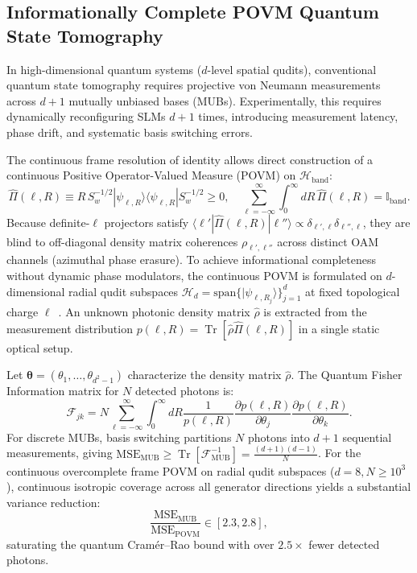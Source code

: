 \documentclass{optica-article}
\begin{document}
\subsection{Informationally Complete POVM Quantum State Tomography}

In high-dimensional quantum systems ($d$-level spatial qudits), conventional quantum state tomography requires projective von Neumann measurements across $d+1$ mutually unbiased bases (MUBs). Experimentally, this requires dynamically reconfiguring SLMs $d+1$ times, introducing measurement latency, phase drift, and systematic basis switching errors.

The continuous frame resolution of identity allows direct construction of a continuous Positive Operator-Valued Measure (POVM) on $\mathcal{H}_{\text{band}}$:
\begin{equation}
\boxed{\hat{\Pi}(\ell, R) \equiv R \, S_w^{-1/2} |\psi_{\ell, R}\rangle \langle \psi_{\ell, R}| S_w^{-1/2} \ge 0, \quad \sum_{\ell=-\infty}^\infty \int_0^\infty dR \, \hat{\Pi}(\ell, R) = \mathbb{I}_{\text{band}}.}
\label{eq:povm_def}
\end{equation}
Because definite-$\ell$ projectors satisfy $\langle \ell' | \hat{\Pi}(\ell, R) | \ell'' \rangle \propto \delta_{\ell', \ell} \delta_{\ell'', \ell}$, they are blind to off-diagonal density matrix coherences $\rho_{\ell', \ell''}$ across distinct OAM channels (azimuthal phase erasure). To achieve informational completeness without dynamic phase modulators, the continuous POVM is formulated on $d$-dimensional radial qudit subspaces $\mathcal{H}_d = \text{span}\{|\psi_{\ell, R_j}\rangle\}_{j=1}^d$ at fixed topological charge $\ell$~\cite{Renes2004,BraunsteinCaves1994}. An unknown photonic density matrix $\hat{\rho}$ is extracted from the measurement distribution $p(\ell, R) = \operatorname{Tr}[\hat{\rho} \hat{\Pi}(\ell, R)]$ in a single static optical setup.

Let $\boldsymbol{\theta} = (\theta_1, \dots, \theta_{d^2-1})$ characterize the density matrix $\hat{\rho}$. The Quantum Fisher Information matrix for $N$ detected photons is:
\begin{equation}
\mathcal{F}_{jk} = N \sum_{\ell=-\infty}^\infty \int_0^\infty dR \frac{1}{p(\ell, R)} \frac{\partial p(\ell, R)}{\partial \theta_j} \frac{\partial p(\ell, R)}{\partial \theta_k}.
\label{eq:fisher_matrix_def}
\end{equation}
For discrete MUBs, basis switching partitions $N$ photons into $d+1$ sequential measurements, giving $\text{MSE}_{\text{MUB}} \ge \operatorname{Tr}[\mathcal{F}_{\text{MUB}}^{-1}] = \frac{(d+1)(d-1)}{N}$. For the continuous overcomplete frame POVM on radial qudit subspaces ($d=8, N \ge 10^3$), continuous isotropic coverage across all generator directions yields a substantial variance reduction:
\begin{equation}
\boxed{\frac{\text{MSE}_{\text{MUB}}}{\text{MSE}_{\text{POVM}}} \in [2.3, 2.8],}
\label{eq:cramer_rao_advantage}
\end{equation}
saturating the quantum Cramér--Rao bound with over $2.5\times$ fewer detected photons.
\end{document}
